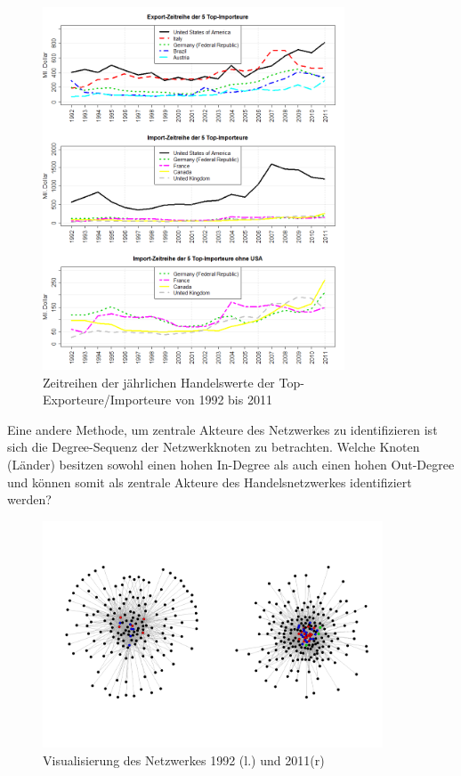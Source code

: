 \documentclass[a4paper,ngerman,oneside,titlepage,bibliography=totoc,11pt]{scrreprt}
\begin{document}
\begin{figure}[ht]
	\centering
		\includegraphics[width= 0.8\textwidth]{Grafiken/ts_tops.png}
	\caption{Zeitreihen der jährlichen Handelswerte der Top-Exporteure/Importeure von 1992 bis 2011}
	\label{fig:ts_tops}
\end{figure}
Eine andere Methode, um zentrale Akteure des Netzwerkes zu identifizieren ist sich die Degree-Sequenz der Netzwerkknoten zu betrachten. Welche Knoten (Länder) besitzen sowohl einen hohen In-Degree als auch einen hohen Out-Degree und können somit als zentrale Akteure des Handelsnetzwerkes identifiziert werden?
\begin{figure}[ht]
	\centering
		\includegraphics[width=0.90\textwidth]{Grafiken/ts_network.png}
	\caption{Visualisierung des Netzwerkes 1992 (l.) und 2011(r)}
	\label{fig:ts_network}
\end{figure}
\end{document}
